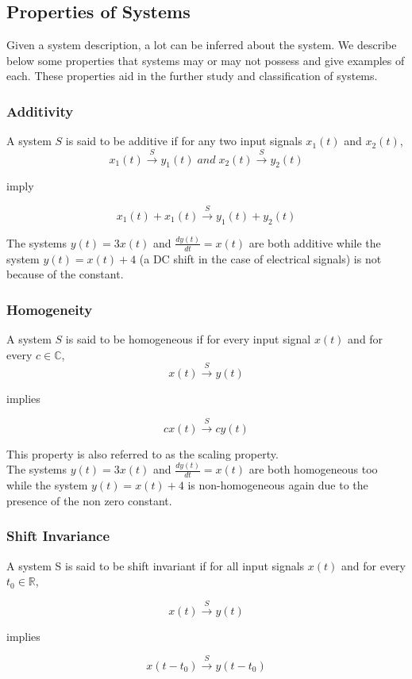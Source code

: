 \subsection{Properties of Systems}
Given a system description, a lot can be inferred about the system. We describe below some properties that systems may or may not possess and give examples of each. These properties aid in the further study and classification of systems.

\subsubsection{Additivity}
A system $S$ is said to be additive if for any two input signals $x_{1}(t)$ and $x_{2}(t)$,
\[
x_{1}(t) \xrightarrow{S} y_{1}(t) \; and \; x_{2}(t) \xrightarrow{S} y_{2}(t)
\]
\begin{center}
imply
\end{center}
\[
x_{1}(t) + x_{1}(t) \xrightarrow{S} y_{1}(t) + y_{2}(t)
\]

The systems $y(t) = 3x(t)$ and $\frac{dy(t)}{dt} = x(t)$ are both additive while the system $y(t) = x(t) + 4$ (a DC shift in the case of electrical signals) is not because of the constant.

\subsubsection{Homogeneity}
A system $S$ is said to be homogeneous if for every input signal $x(t)$ and for every $c \in \mathbb{C}$,
\[
x(t) \xrightarrow{S} y(t)
\]
\begin{center}
implies
\end{center}
\[
cx(t) \xrightarrow{S} cy(t)
\]

This property is also referred to as the scaling property.\\

The systems $y(t) = 3x(t)$ and $\frac{dy(t)}{dt} = x(t)$ are both homogeneous too while the system $y(t) = x(t) + 4$ is non-homogeneous again due to the presence of the non zero constant.

\subsubsection{Shift Invariance}
A system S is said to be shift invariant if for all input signals $x(t)$ and for every $t_{0} \in \mathbb{R}$,

\[
x(t) \xrightarrow{S} y(t)
\]
\begin{center}
implies
\end{center}
\[
x(t - t_{0}) \xrightarrow{S} y(t - t_{0})
\]

